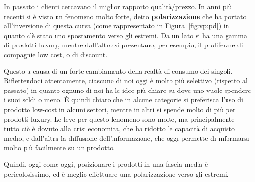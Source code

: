 \noindent In passato i clienti cercavano il miglior rapporto qualità/prezzo. In
anni più recenti si è visto un fenomeno molto forte, detto
\textbf{polarizzazione} che ha portato all'inversione di questa curva (come 
rappresentato in Figura~\ref{fig:vp:pd}) in quanto c'è stato uno spostamento 
verso gli estremi. Da un lato si ha una gamma di prodotti luxury, mentre 
dall'altro si presentano, per esempio, il proliferare di compagnie low cost, o 
di discount.

Questo a causa di un forte cambiamento della realtà di consumo dei singoli.
Riflettendoci attentamente, ciascuno di noi oggi è molto più selettivo
(rispetto al passato) in quanto ognuno di noi ha le idee più chiare su dove uno
vuole spendere i suoi soldi o meno. È quindi chiaro che in alcune categorie si
preferisca l'uso di prodotto low-cost in alcuni settori, mentre in altri si
spende molto di più per prodotti luxury. Le leve per questo fenomeno sono
molte, ma principalmente tutto ciò è dovuto alla crisi economica, che ha
ridotto le capacità di acquisto medio, e dall'altra la diffusione
dell'informazione, che oggi permette di informarsi molto più facilmente su un
prodotto.

Quindi, oggi come oggi, posizionare i prodotti in una fascia media è
pericolosissimo, ed è meglio effettuare una polarizzazione verso gli estremi.
